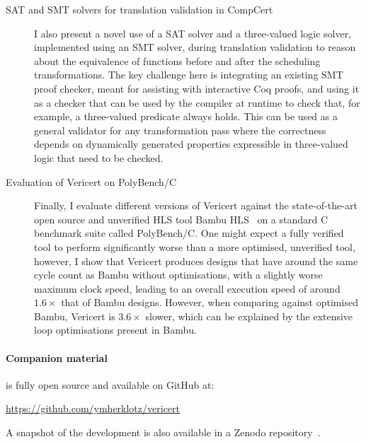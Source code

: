 \begin{description}
\item[SAT and SMT solvers for translation validation in CompCert] I also present
  a novel use of a \gls{SAT} solver and a three-valued logic solver, implemented
  using an \gls{SMT} solver, during translation validation to reason about the
  equivalence of functions before and after the scheduling transformations.  The
  key challenge here is integrating an existing \gls{SMT} proof checker, meant
  for assisting with interactive Coq proofs, and using it as a checker that can
  be used by the compiler at runtime to check that, for example, a three-valued
  predicate always holds.  This can be used as a general validator for any
  transformation pass where the correctness depends on dynamically generated
  properties expressible in three-valued logic that need to be checked.


\item[Evaluation of Vericert on PolyBench/C] Finally, I evaluate different
  versions of Vericert against the state-of-the-art open source and unverified
  \gls{HLS} tool Bambu HLS~\cite{pilato13_bambu} on a standard C benchmark suite
  called PolyBench/C.  One might expect a fully verified tool to perform
  significantly worse than a more optimised, unverified tool, however, I show
  that Vericert produces designs that have around the same cycle count as Bambu
  without optimisations, with a slightly worse maximum clock speed, leading to
  an overall execution speed of around $1.6\times$ that of Bambu designs.
  However, when comparing against optimised Bambu, Vericert is $3.6\times$
  slower, which can be explained by the extensive loop optimisations present in
  Bambu.
\end{description}

\paragraph{Companion material}
\vericert{} is fully open source and available on GitHub at:

\begin{center}
  \url{https://github.com/ymherklotz/vericert}
\end{center}

A snapshot of the \vericert{} development is also available in a Zenodo
repository~\cite{herklotz24_v}.

